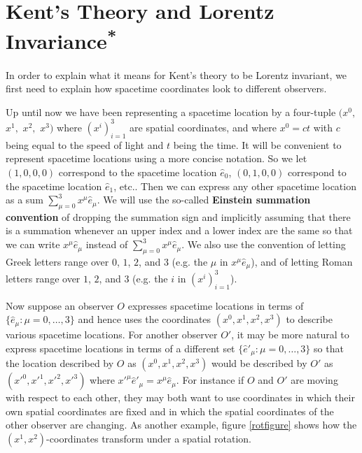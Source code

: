 

\section{Kent's Theory and Lorentz Invariance\label{LorentzInvariance}\textsuperscript{*}}
In order to explain what it means for Kent's theory to be Lorentz invariant, we first need to explain how spacetime coordinates look to different observers. 

Up until now we have been representing a spacetime location by a four-tuple $(x^0,$ $x^1,$ $x^2,$ $x^3)$ where $(x^i)_{i=1}^3$ are spatial coordinates, and where $x^0=ct$ with $c$ being equal to the speed of light and $t$ being the time. It will be convenient to represent spacetime locations using a more concise notation. So we let $(1,0,0,0)$ correspond to the spacetime location $\hat{e}_0$, $(0,1,0,0)$ correspond to the spacetime location $\hat{e}_1$, etc.. Then we can express any other spacetime location  as a sum $\sum_{\mu=0}^3x^\mu\hat{e}_\mu$. We will use the so-called \textbf{Einstein summation convention}\label{Einsteinsum} of dropping the summation sign and implicitly assuming that there is a summation whenever an upper index and a lower index are the same so that we can write $x^\mu\hat{e}_\mu$ instead of $\sum_{\mu=0}^3x^\mu\hat{e}_\mu$. We also use the convention of letting Greek letters range over $0$, $1$, $2$, and $3$ (e.g. the $\mu$ in $x^\mu\hat{e}_\mu$), and of letting Roman letters range over $1$, $2$, and $3$ (e.g. the $i$ in $(x^i)_{i=1}^3$).

Now suppose an observer $O$ expresses spacetime locations in terms of $\{\hat{e}_\mu:\mu=0,\ldots,3\}$ and hence uses the coordinates $(x^0, x^1, x^2, x^3)$ to describe various spacetime locations. For another observer $O'$, it may be more natural to express spacetime locations in terms of a different set $\{\hat{e}'_\mu:\mu=0,\ldots,3\}$ so that the location described by $O$ as $(x^0, x^1, x^2, x^3)$ would be described by $O'$ as $({x'}^0, {x'}^1, {x'}^2, {x'}^3)$ where ${x'}^\mu{\hat{e}'}_\mu=x^\mu\hat{e}_\mu$.  For instance if $O$ and $O'$ are moving with respect to each other, they may both want to use coordinates in which their own spatial coordinates are fixed and in which the spatial coordinates of the other observer are changing. As another example, figure \ref{rotfigure} shows how the $(x^1, x^2)$-coordinates transform under a spatial rotation. 


